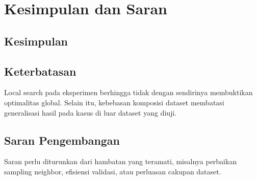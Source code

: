 \section{Kesimpulan dan Saran}
\subsection{Kesimpulan}


\subsection{Keterbatasan}
Local search pada eksperimen berhingga tidak dengan sendirinya membuktikan
optimalitas global. Selain itu, kebebasan komposisi dataset membatasi
generalisasi hasil pada kasus di luar dataset yang diuji.


\subsection{Saran Pengembangan}
Saran perlu diturunkan dari hambatan yang teramati, misalnya perbaikan
sampling neighbor, efisiensi validasi, atau perluasan cakupan dataset.
